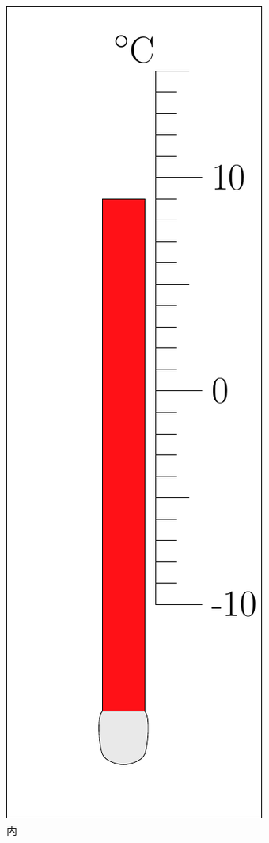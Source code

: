 \documentclass[12pt]{exam}%
\begin{document}
\begin{knowledge}
\begin{minipage}{\textwidth}
\begin{minipage}{0.2\textwidth}
\begin{figure}[H]
\includegraphics[width=0.9\linewidth]{figures/2013湖北黄冈34丙.pdf} 
\caption{丙}
\end{figure}
\end{minipage} 
\end{minipage} 



\end{knowledge}
\end{document}

